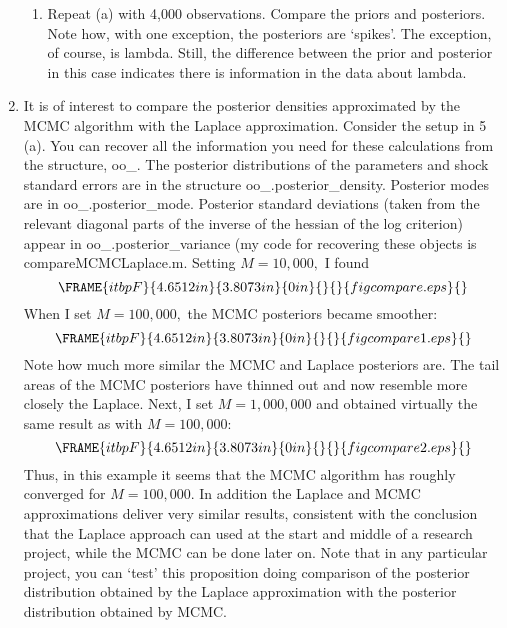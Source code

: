 \begin{enumerate}
\begin{enumerate}
\item Repeat (a) with 4,000 observations. Compare the priors and posteriors.
Note how, with one exception, the posteriors are `spikes'. The exception, of
course, is lambda. Still, the difference between the prior and posterior in
this case indicates there is information in the data about lambda.
\end{enumerate}

\item It is of interest to compare the posterior densities approximated by
the MCMC algorithm with the Laplace approximation. Consider the setup in 5
(a). You can recover all the information you need for these calculations
from the structure, oo\_. The posterior distributions of the parameters and
shock standard errors are in the structure oo\_.posterior\_density.
Posterior modes are in oo\_.posterior\_mode. Posterior standard deviations
(taken from the relevant diagonal parts of the inverse of the hessian of the
log criterion) appear in oo\_.posterior\_variance (my code for recovering
these objects is compareMCMCLaplace.m. Setting $M=10,000,$ I found%
\[
\]%
\[
\]%
\[
\FRAME{itbpF}{4.6512in}{3.8073in}{0in}{}{}{figcompare.eps}{\special{language
"Scientific Word";type "GRAPHIC";maintain-aspect-ratio TRUE;display
"USEDEF";valid_file "F";width 4.6512in;height 3.8073in;depth
0in;original-width 6.0848in;original-height 4.9741in;cropleft "0";croptop
"1";cropright "1";cropbottom "0";filename 'figcompare.eps';file-properties
"XNPEU";}} 
\]%
\[
\]%
When I set $M=100,000,$ the MCMC posteriors became smoother:%
\[
\]%
\[
\]%
\[
\FRAME{itbpF}{4.6512in}{3.8073in}{0in}{}{}{figcompare1.eps}{\special%
{language "Scientific Word";type "GRAPHIC";maintain-aspect-ratio
TRUE;display "USEDEF";valid_file "F";width 4.6512in;height 3.8073in;depth
0in;original-width 6.0848in;original-height 4.9741in;cropleft "0";croptop
"1";cropright "1";cropbottom "0";filename 'figcompare1.eps';file-properties
"XNPEU";}} 
\]%
\[
\]%
Note how much more similar the MCMC and Laplace posteriors are. The tail
areas of the MCMC posteriors have thinned out and now resemble more closely
the Laplace. Next, I set $M=1,000,000$ and obtained virtually the same
result as with $M=100,000:$%
\[
\]%
\[
\]%
\[
\FRAME{itbpF}{4.6512in}{3.8073in}{0in}{}{}{figcompare2.eps}{\special%
{language "Scientific Word";type "GRAPHIC";maintain-aspect-ratio
TRUE;display "USEDEF";valid_file "F";width 4.6512in;height 3.8073in;depth
0in;original-width 6.0848in;original-height 4.9741in;cropleft "0";croptop
"1";cropright "1";cropbottom "0";filename 'figcompare2.eps';file-properties
"XNPEU";}} 
\]%
\[
\]%
Thus, in this example it seems that the MCMC algorithm has roughly converged
for $M=100,000.$ In addition the Laplace and MCMC approximations deliver
very similar results, consistent with the conclusion that the Laplace
approach can used at the start and middle of a research project, while the
MCMC can be done later on. Note that in any particular project, you can
`test' this proposition doing comparison of the posterior distribution
obtained by the Laplace approximation with the posterior distribution
obtained by MCMC.


\end{enumerate}
